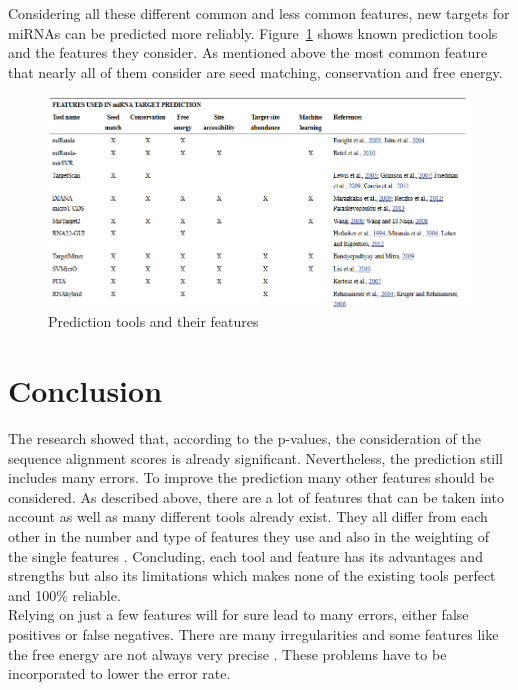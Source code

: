 \documentclass[11pt,  a4paper]{report}
\begin{document}
   
Considering all these different common and less common features, new targets for miRNAs can be predicted more reliably. Figure~\ref{fig:tools} shows known prediction tools and the features they consider. As mentioned above the most common feature that nearly all of them consider are seed matching, conservation and free energy. \\


\begin{figure}
\centering
\includegraphics[scale=0.6]{results/tools.PNG}
\caption{Prediction tools and their features}
\label{fig:tools}
\end{figure}


\vspace{2cm}



\chapter{Conclusion}
\label{chapter:conlusion}

The research showed that, according to the p-values, the consideration of the sequence alignment scores is already significant. Nevertheless, the prediction still includes many errors. To improve the prediction many other features should be considered.
As described above, there are a lot of features that can be taken into account as well as many different tools already exist. They all differ from each other in the number and type of features they use and also in the weighting of the single features \cite{Peterson}. Concluding, each tool and feature has its advantages and strengths but also its limitations which makes none of the existing tools perfect and 100\% reliable.\\

Relying on just a few features will for sure lead to many errors, either false positives or false negatives. There are many irregularities and some features like the free energy are not always very precise \cite{Peterson}. These problems have to be incorporated to lower the error rate.\\
\end{document}
